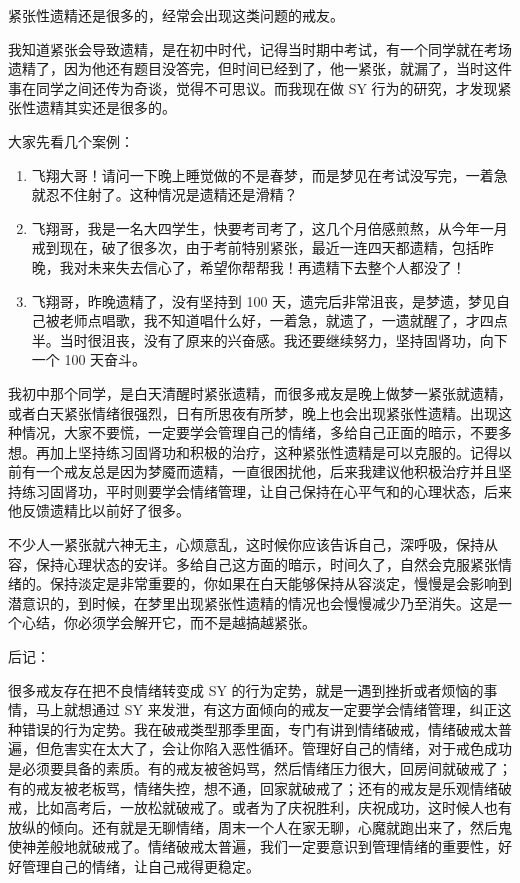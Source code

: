 \documentclass[fontset=founder]{ctexart}
\begin{document}
紧张性遗精还是很多的，经常会出现这类问题的戒友。

我知道紧张会导致遗精，是在初中时代，记得当时期中考试，有一个同学就在考场遗精了，因为他还有题目没答完，但时间已经到了，他一紧张，就漏了，当时这件事在同学之间还传为奇谈，觉得不可思议。而我现在做 SY 行为的研究，才发现紧张性遗精其实还是很多的。

大家先看几个案例：

\begin{enumerate}
    \item 飞翔大哥！请问一下晚上睡觉做的不是春梦，而是梦见在考试没写完，一着急就忍不住射了。这种情况是遗精还是滑精？
    \item 飞翔哥，我是一名大四学生，快要考司考了，这几个月倍感煎熬，从今年一月戒到现在，破了很多次，由于考前特别紧张，最近一连四天都遗精，包括昨晚，我对未来失去信心了，希望你帮帮我！再遗精下去整个人都没了！
    \item 飞翔哥，昨晚遗精了，没有坚持到 100 天，遗完后非常沮丧，是梦遗，梦见自己被老师点唱歌，我不知道唱什么好，一着急，就遗了，一遗就醒了，才四点半。当时很沮丧，没有了原来的兴奋感。我还要继续努力，坚持固肾功，向下一个 100 天奋斗。
\end{enumerate}

我初中那个同学，是白天清醒时紧张遗精，而很多戒友是晚上做梦一紧张就遗精，或者白天紧张情绪很强烈，日有所思夜有所梦，晚上也会出现紧张性遗精。出现这种情况，大家不要慌，一定要学会管理自己的情绪，多给自己正面的暗示，不要多想。再加上坚持练习固肾功和积极的治疗，这种紧张性遗精是可以克服的。记得以前有一个戒友总是因为梦魇而遗精，一直很困扰他，后来我建议他积极治疗并且坚持练习固肾功，平时则要学会情绪管理，让自己保持在心平气和的心理状态，后来他反馈遗精比以前好了很多。

不少人一紧张就六神无主，心烦意乱，这时候你应该告诉自己，深呼吸，保持从容，保持心理状态的安详。多给自己这方面的暗示，时间久了，自然会克服紧张情绪的。保持淡定是非常重要的，你如果在白天能够保持从容淡定，慢慢是会影响到潜意识的，到时候，在梦里出现紧张性遗精的情况也会慢慢减少乃至消失。这是一个心结，你必须学会解开它，而不是越搞越紧张。

后记：

很多戒友存在把不良情绪转变成 SY 的行为定势，就是一遇到挫折或者烦恼的事情，马上就想通过 SY 来发泄，有这方面倾向的戒友一定要学会情绪管理，纠正这种错误的行为定势。我在破戒类型那季里面，专门有讲到情绪破戒，情绪破戒太普遍，但危害实在太大了，会让你陷入恶性循环。管理好自己的情绪，对于戒色成功是必须要具备的素质。有的戒友被爸妈骂，然后情绪压力很大，回房间就破戒了；有的戒友被老板骂，情绪失控，想不通，回家就破戒了；还有的戒友是乐观情绪破戒，比如高考后，一放松就破戒了。或者为了庆祝胜利，庆祝成功，这时候人也有放纵的倾向。还有就是无聊情绪，周末一个人在家无聊，心魔就跑出来了，然后鬼使神差般地就破戒了。情绪破戒太普遍，我们一定要意识到管理情绪的重要性，好好管理自己的情绪，让自己戒得更稳定。
\end{document}
